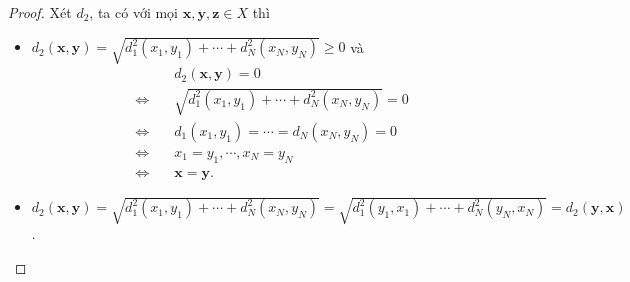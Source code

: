 \begin{proof}
Xét $d_2$, ta có với mọi $\mathbf{x}, \mathbf{y}, \mathbf{z} \in X$ thì
\begin{itemize}
    \item $d_2(\mathbf{x}, \mathbf{y}) = \sqrt{d_1^2(x_1,y_1) + \cdots + d_N^2(x_N,y_N)} \geq 0$ và
    \begin{align*}
        &\quad d_2(\mathbf{x}, \mathbf{y}) = 0\\
        \Leftrightarrow&\quad \sqrt{d_1^2(x_1,y_1) + \cdots + d_N^2(x_N,y_N)} = 0\\
        \Leftrightarrow&\quad d_1(x_1,y_1) = \cdots = d_N(x_N,y_N) = 0\\
        \Leftrightarrow&\quad x_1 = y_1, \cdots, x_N = y_N\\
        \Leftrightarrow&\quad \mathbf{x} = \mathbf{y}.
    \end{align*}

    \item $d_2(\mathbf{x}, \mathbf{y}) = \sqrt{d_1^2(x_1,y_1) + \cdots + d_N^2(x_N,y_N)} = \sqrt{d_1^2(y_1,x_1) + \cdots + d_N^2(y_N,x_N)} = d_2(\mathbf{y}, \mathbf{x})$.
    

\end{itemize}
\end{proof}
